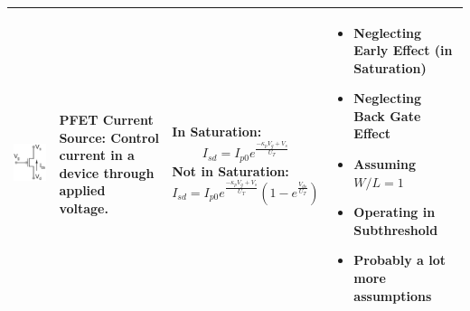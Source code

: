 \begin{table}[h!]
\begin{tabular}{ | m{4cm} | m{4cm} | m{5cm} | m{4cm} | }
    
    \\ \hline
    \center \includegraphics[width=0.7\linewidth]{Figures/pFET_Current_Source.PNG}
    &
    \textbf{PFET Current Source}: \newline  Control current in a device through applied voltage.
    &
    \centering In Saturation: \newline \newline \begin{equation*}I_{sd} = I_{p0} e^{\frac{-\kappa_p V_g + V_s}{U_T}}\end{equation*} \newline \newline
    \centering Not in Saturation: \newline \newline \begin{equation*}I_{sd} = I_{p0} e^{\frac{-\kappa_p V_g + V_s}{U_T}} (1 - e^{\frac{V_{ds}}{U_T}})\end{equation*}
    & 
    \begin{itemize}
        \item Neglecting Early Effect (in Saturation)
        \item Neglecting Back Gate Effect
        \item Assuming $W/L = 1$
        \item Operating in Subthreshold
        \item Probably a lot more assumptions 
    \end{itemize}
    
    \\ \hline
    
  \end{tabular}
\end{table}
